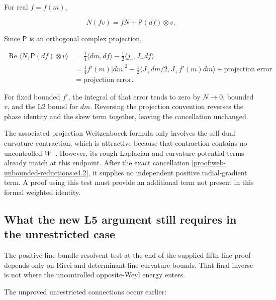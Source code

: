 For real \(f=f(m)\),

\[
 N(fv)=fN+\mathsf P(df)\otimes v.
\]

Since \(\mathsf P\) is an orthogonal complex projection,

\[
 \begin{aligned}
 \operatorname{Re}\langle N,\mathsf P(df)\otimes v\rangle
 &=\frac14\langle dm,df\rangle
   -\frac12\langle j_v,J_+df\rangle\\
 &=\frac14f'(m)|dm|^2
   -\frac12\langle J_+dm/2,J_+f'(m)dm\rangle
   +\text{projection error}\\
 &=\text{projection error}.
 \end{aligned}
 \tag{\thesection.4.2}\label{proof:web-unbounded-reductions:e4.2}
\]

For fixed bounded \(f'\), the integral of that error tends to zero by \(N\to0\), bounded \(v\), and the L2 bound for \(dm\). Reversing the projection convention reverses the phase identity and the skew term together, leaving the cancellation unchanged.

The associated projection Weitzenboeck formula only involves the self-dual curvature contraction, which is attractive because that contraction contains no uncontrolled \(W^-\). However, its rough-Laplacian and curvature-potential terms already match at this endpoint. After the exact cancellation \eqref{proof:web-unbounded-reductions:e4.2}, it supplies no independent positive radial-gradient term. A proof using this test must provide an additional term not present in this formal weighted identity.

\hypertarget{proof:web-unbounded-reductions:s5}{%
\subsection{What the new L5 argument still requires in the unrestricted case}\label{proof:web-unbounded-reductions:s5}}

The positive line-bundle resolvent test at the end of the supplied fifth-line proof depends only on Ricci and determinant-line curvature bounds. That final inverse is not where the uncontrolled opposite-Weyl energy enters.

The unproved unrestricted connections occur earlier:

